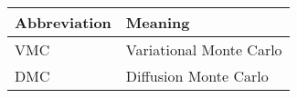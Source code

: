\noindent\\\\

\begin{tabular}[h]{p{3cm}|l}
	Abbreviation & Meaning\\
	\hline
	VMC & Variational Monte Carlo\\
	DMC & Diffusion Monte Carlo\\
\end{tabular}
\newpage